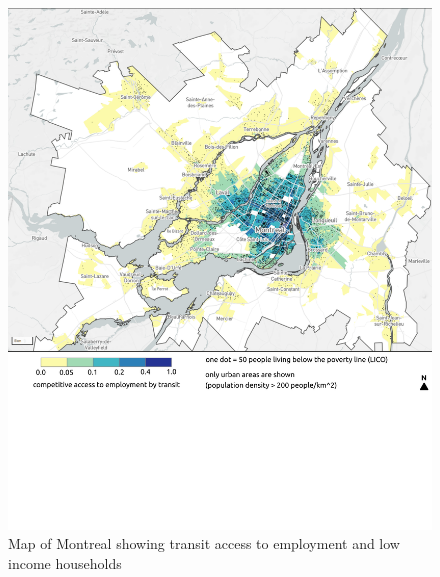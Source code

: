 \documentclass[11 pt, letterpaper]{article}
\begin{document}
{\begin{figure}[H]
	\vspace{5mm}
	\caption{Map of Montreal showing transit access to employment and low income households} 
	\label{a_van}
	\centerline{\includegraphics[width=6.5in]{figures/appendix_maps/a_mtl.png}}
\end{figure}

}
\end{document}
